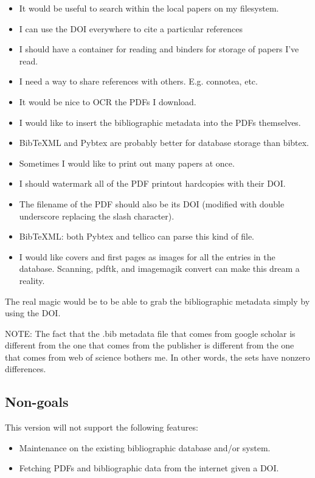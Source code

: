 \documentclass[letterpaper,12pt]{article}
\begin{document}
\begin{itemize}
\item It would be useful to search within the local papers on my filesystem.
\item I can use the DOI everywhere to cite a particular references
\item I should have a container for reading and binders for storage of papers I've read.
\item I need a way to share references with others. E.g. connotea, etc.
\item It would be nice to OCR the PDFs I download.
\item I would like to insert the bibliographic metadata into the PDFs themselves.
\item BibTeXML and Pybtex are probably better for database storage than bibtex.
\item Sometimes I would like to print out many papers at once.
\item I should watermark all of the PDF printout hardcopies with their DOI.
\item The filename of the PDF should also be its DOI (modified with double underscore replacing the slash character).
\item BibTeXML: both Pybtex and tellico can parse this kind of file.
\item I would like covers and first pages as images for all the entries in the database. Scanning, pdftk, and imagemagik convert can make this dream a reality.
\end{itemize}

The real magic would be to be able to grab the bibliographic metadata simply by using the DOI.

NOTE: The fact that the .bib metadata file that comes from google scholar is different from the one that comes from the publisher is different from the one that comes from web of science bothers me. In other words, the sets have nonzero differences.

\subsection{Non-goals}
This version will not support the following features:

\begin{itemize}
\item Maintenance on the existing bibliographic database and/or system.
\item Fetching PDFs and bibliographic data from the internet given a DOI.
\end{itemize}
\end{document}
